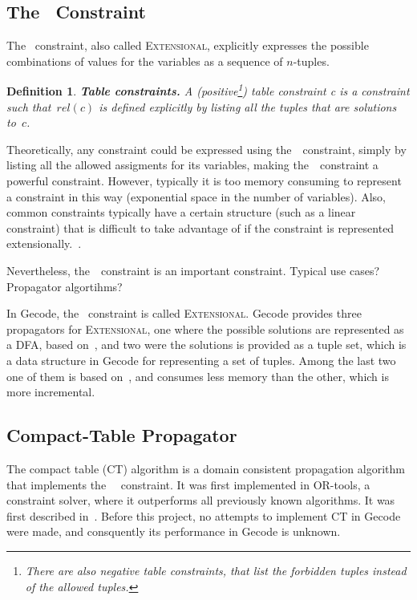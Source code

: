 \documentclass[a4paper,11pt]{article}
\newtheorem{definition}{Definition}
\newcommand{\Todo}[1]{{\color{blue}#1}}
\newcommand{\Table}{\Constraint{Table}~}
\newcommand{\Extensional}{\Constraint{Extensional}~}
\def\Extensional{\textsc{Extensional}}
\newcommand{\CTpaper}[0]{DBLP:conf/cp/DemeulenaereHLP16}
\numberwithin{equation}{section}
\begin{document}
\subsection{The \Table Constraint}
\label{bg:table}
The \Table constraint, also called \Extensional,
explicitly expresses the possible combinations of values for the variables as a
sequence of $n$-tuples.

\begin{definition}
  \textbf{Table constraints.} A
  (positive\footnote{There are also negative table constraints, that list the forbidden tuples instead of the allowed tuples.})
  \emph{table constraint c} is a
  constraint such that~$rel(c)$ is defined explicitly by listing all the
  tuples that are solutions to~$c$.
\end{definition}

Theoretically, any constraint could be expressed using the~\Table constraint,
simply by listing all the allowed assigments for its variables, 
making the~\Table constraint a powerful constraint. However, typically
it is too memory consuming to represent a constraint in this way
(exponential space in the number of variables). Also, common constraints
typically have a certain structure (such as a linear constraint)
that is difficult to take advantage of if the constraint is represented
extensionally.~\cite{SchulteCarlsson:FDsys}.

Nevertheless, the~\Table constraint is an important constraint.
\Todo{Typical use cases? Propagator algortihms?}

In Gecode, the \Table constraint is called \Extensional. Gecode provides
three propagators for \Extensional, one where the possible solutions are
represented as a DFA, based on~\cite{Pesant:seqs}, and two were the solutions
is provided as a tuple set, which is a data structure in Gecode for representing 
a set of tuples. Among the last two one of them is based 
on~\cite{DBLP:journals/ai/BessiereRYZ05}, and consumes less memory than the
other, which is more incremental. 


\subsection{Compact-Table Propagator}
\label{bg:ct}
The compact table (CT) algorithm is a domain consistent propagation algorithm
that implements the \Table~constraint. It was first implemented in
OR-tools, a constraint solver, where it outperforms all previously
known algorithms. It was first described in~\cite{\CTpaper}.
Before this project, no attempts to implement CT in Gecode were made,
and consquently its performance in Gecode is unknown.
\end{document}
